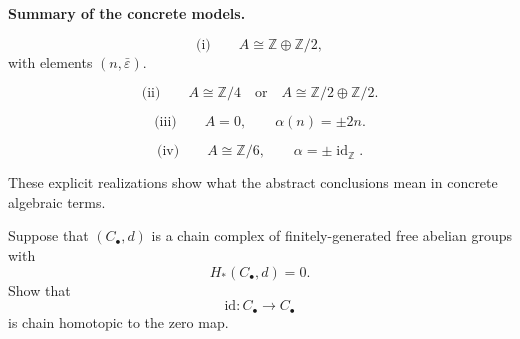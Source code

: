 \begin{solution}
\par

\textbf{Summary of the concrete models.}

\[
\text{(i)}\qquad A\cong \mathbb Z\oplus \mathbb Z/2,
\]
with elements \((n,\bar\varepsilon)\).

\[
\text{(ii)}\qquad A\cong \mathbb Z/4
\quad\text{or}\quad
A\cong \mathbb Z/2\oplus \mathbb Z/2.
\]

\[
\text{(iii)}\qquad A=0,\qquad \alpha(n)=\pm 2n.
\]

\[
\text{(iv)}\qquad A\cong \mathbb Z/6,\qquad \alpha=\pm \operatorname{id}_{\mathbb Z}.
\]

These explicit realizations show what the abstract conclusions mean in concrete algebraic terms.
\end{solution}

\begin{problem}
Suppose that \((C_\bullet,d)\) is a chain complex of finitely-generated free abelian groups with
\[
H_*(C_\bullet,d)=0.
\]
Show that
\[
\mathrm{id}:C_\bullet\to C_\bullet
\]
is chain homotopic to the zero map.
\end{problem}

